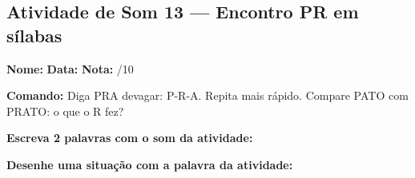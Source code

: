 \subsection{Atividade de Som 13 --- Encontro PR em sílabas}
\begin{exercicio}



\noindent\textbf{Nome:} \underline{\hspace{3.2cm}} \quad \textbf{Data:} \underline{\hspace{1.6cm}} \quad \textbf{Nota:} \underline{\hspace{0.9cm}}/10


\noindent\textbf{Comando:} Diga PRA devagar: P-R-A. Repita mais rápido. Compare PATO com PRATO: o que o R fez?


\begin{center}
\end{center}

\noindent\textbf{Escreva 2 palavras com o som da atividade:}

\begin{center}
  \underline{\hspace{3cm}} \quad \underline{\hspace{3cm}}
\end{center}

\noindent\textbf{Desenhe uma situação com a palavra da atividade:}

\begin{center}
\end{center}

\end{exercicio}



